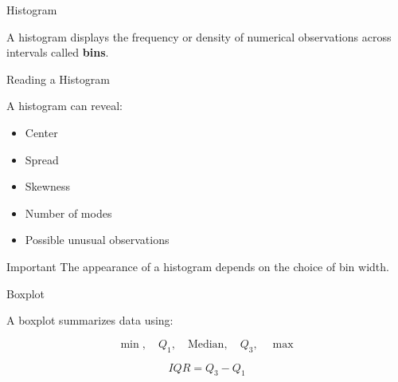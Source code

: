\documentclass[aspectratio=169,11pt]{beamer}
\begin{document}
\begin{frame}{Histogram}

A histogram displays the frequency or density of numerical observations across intervals called \textbf{bins}.

\begin{center}
\end{center}

\end{frame}

\begin{frame}{Reading a Histogram}

A histogram can reveal:

\begin{itemize}
    \item Center
    \item Spread
    \item Skewness
    \item Number of modes
    \item Possible unusual observations
\end{itemize}

\begin{alertblock}{Important}
The appearance of a histogram depends on the choice of bin width.
\end{alertblock}

\end{frame}

\begin{frame}{Boxplot}

A boxplot summarizes data using:

\[
\boxed{
\min,\quad Q_1,\quad
\text{Median},\quad Q_3,\quad\max
}
\]

\begin{center}
\end{center}

\[
IQR=Q_3-Q_1
\]

\end{frame}
\end{document}
